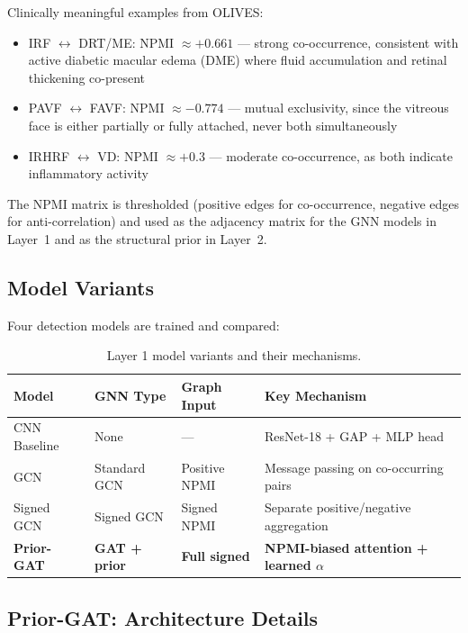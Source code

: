 \documentclass[12pt,a4paper]{article}
\begin{document}
Clinically meaningful examples from OLIVES:
\begin{itemize}[nosep]
  \item IRF $\leftrightarrow$ DRT/ME: NPMI $\approx +0.661$ --- strong co-occurrence, consistent with active diabetic macular edema (DME) where fluid accumulation and retinal thickening co-present
  \item PAVF $\leftrightarrow$ FAVF: NPMI $\approx -0.774$ --- mutual exclusivity, since the vitreous face is either partially or fully attached, never both simultaneously
  \item IRHRF $\leftrightarrow$ VD: NPMI $\approx +0.3$ --- moderate co-occurrence, as both indicate inflammatory activity
\end{itemize}

The NPMI matrix is thresholded (positive edges for co-occurrence, negative edges for anti-correlation) and used as the adjacency matrix for the GNN models in Layer~1 and as the structural prior in Layer~2.

\subsection{Model Variants}

Four detection models are trained and compared:

\begin{table}[H]
\centering
\caption{Layer 1 model variants and their mechanisms.}
\begin{tabular}{@{}llll@{}}
\toprule
\textbf{Model} & \textbf{GNN Type} & \textbf{Graph Input} & \textbf{Key Mechanism} \\
\midrule
CNN Baseline & None & --- & ResNet-18 + GAP + MLP head \\
GCN & Standard GCN & Positive NPMI & Message passing on co-occurring pairs \\
Signed GCN & Signed GCN & Signed NPMI & Separate positive/negative aggregation \\
\textbf{Prior-GAT} & \textbf{GAT + prior} & \textbf{Full signed} & \textbf{NPMI-biased attention + learned $\alpha$} \\
\bottomrule
\end{tabular}
\end{table}

\subsection{Prior-GAT: Architecture Details}
\end{document}
